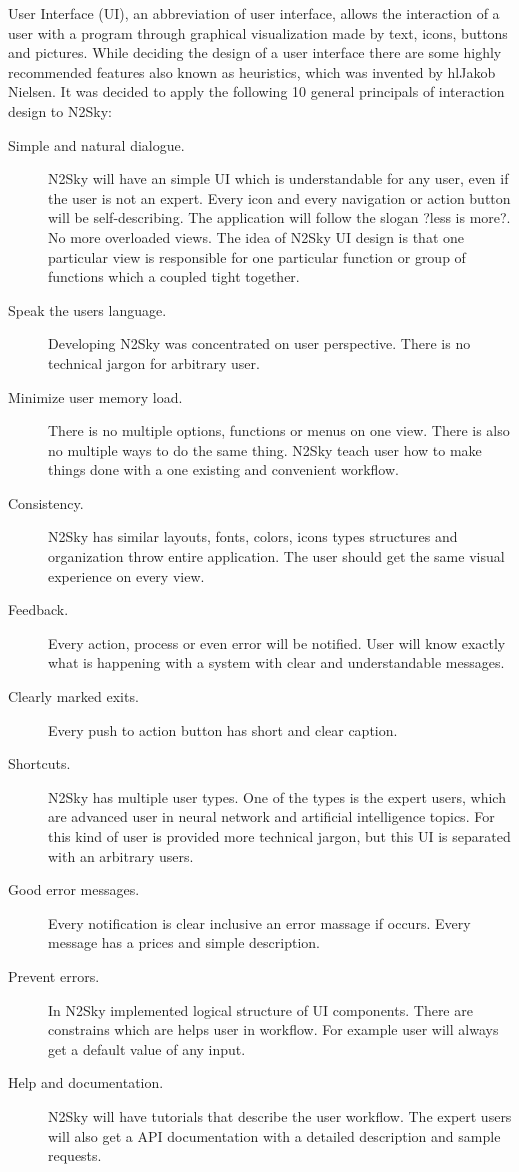User Interface (UI), an abbreviation of user interface, allows the interaction of a user with a program through graphical visualization made by text, icons, buttons and pictures. While deciding the design of a user interface there are some highly recommended features also known as heuristics, which was invented by hl{Jakob Nielsen}. It was decided to apply the following 10 general principals of interaction design to N2Sky:

\begin{description}
\item[Simple and natural dialogue.]  N2Sky will have an simple UI which is understandable for any user, even if the user is not an expert. Every icon and every navigation or action button will be self-describing. The application will follow the slogan ?less is more?. No more overloaded views. The idea of N2Sky UI design is that one particular view is responsible for one particular function or group of functions which a coupled tight together.
\item[Speak the users language.] Developing N2Sky was concentrated on user perspective. There is no technical jargon for arbitrary user.
\item[Minimize user memory load.] There is no multiple options, functions or menus on one view. There is also no multiple ways to do the same thing. N2Sky teach user how to make things done with a one existing and convenient workflow. 
\item[Consistency.] N2Sky has similar layouts, fonts, colors, icons types structures and organization throw entire application. The user should get the same visual experience on every view.
\item[Feedback.] Every action, process or even error will be notified. User will know exactly what is happening with a system with clear and understandable messages.
\item[Clearly marked exits.]  Every push to action button has short and clear caption.
\item[Shortcuts.] N2Sky has multiple user types. One of the types is the expert users, which are advanced user in neural network and artificial intelligence topics. For this kind of user is provided more technical jargon, but this UI is separated with an arbitrary users.  
\item[Good error messages.] Every notification is clear inclusive an error massage if occurs. Every message has a prices and simple description.
\item[Prevent errors.] In N2Sky implemented logical structure of UI components. There are constrains which are helps user in workflow. For example user will always get a default value of any input.
\item[Help and documentation.] N2Sky will have tutorials that describe the user workflow. The expert users will also get a API documentation with a detailed description and sample requests. 

\end{description}

